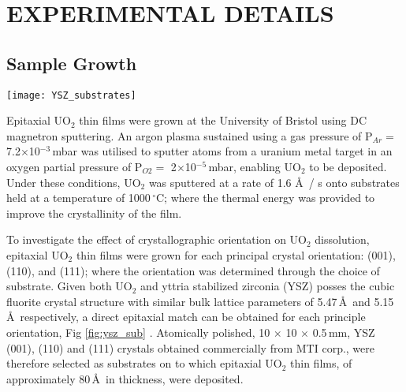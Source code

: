 \documentclass[twocolumn,prl,nobalancelastpage,aps,10pt]{revtex4-1}
\begin{document}
\section{EXPERIMENTAL DETAILS}
\subsection{Sample Growth}

\begin{figure*}
	\centering
	\texttt{[image: YSZ\_substrates]}
	\caption{Deposition of the three principle UO$_2$ orientations (001), (110) and (111) was achieved through using (001), (110) and (111) oriented YSZ substrates. The lattice mismatch is the same in each case at 6.3 $\%$. Both the (001) and (111) surfaces are non-polar, whereas the (110) is polar \cite{Bottin2016}. Figures produced using the VESTA software \cite{Momma2011}.}
	\label{fig:ysz_sub}
\end{figure*}

Epitaxial UO$_2$ thin films were grown at the University of Bristol using DC magnetron sputtering. An argon plasma sustained using a gas pressure of P$_{Ar} =$ 7.2$\times$10$^{-3}$\,mbar was utilised to sputter atoms from a uranium metal target in an oxygen partial pressure of P$_{O2} =$ 2$\times$10$^{-5}$\,mbar, enabling UO$_2$ to be deposited. Under these conditions, UO$_2$ was sputtered at a rate of 1.6 \AA\, / s onto substrates held at a temperature of 1000$\,^{\circ}$C; where the thermal energy was provided to improve the crystallinity of the film.

To investigate the effect of crystallographic orientation on UO$_2$ dissolution, epitaxial UO$_2$ thin films were grown for each principal crystal orientation: (001), (110), and (111); where the orientation was determined through the choice of substrate. Given both UO$_2$ and yttria stabilized zirconia (YSZ) posses the cubic fluorite crystal structure with similar bulk lattice parameters of 5.47\,\AA\, and 5.15\,\AA\, respectively, a direct epitaxial match can be obtained for each principle orientation, Fig \ref{fig:ysz_sub} \cite{Strehle2012}. Atomically polished, 10 $\times$ 10 $\times$ 0.5\,mm, YSZ (001), (110) and (111) crystals obtained commercially from MTI corp., were therefore selected as substrates on to which epitaxial UO$_2$ thin films, of approximately 80\,\AA\, in thickness, were deposited.
\end{document}

